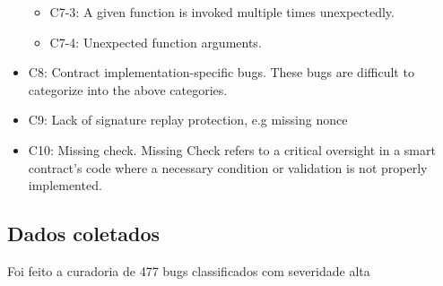 \documentclass[11pt]{article}
\begin{document}
\begin{itemize}
\begin{itemize}
\item C7-3: A given function is invoked multiple times unexpectedly.
\item C7-4: Unexpected function arguments.
\end{itemize}
\item C8: Contract implementation-specific bugs. These bugs are difficult to categorize into the above categories.
\item C9: Lack of signature replay protection, e.g missing nonce
\item C10: Missing check.
Missing Check refers to a critical oversight in a smart contract's code where a necessary condition or validation is not properly implemented.
\end{itemize}
\subsection{Dados coletados}
\label{sec:org4468182}
Foi feito a curadoria de 477 bugs classificados com severidade alta
\end{document}

